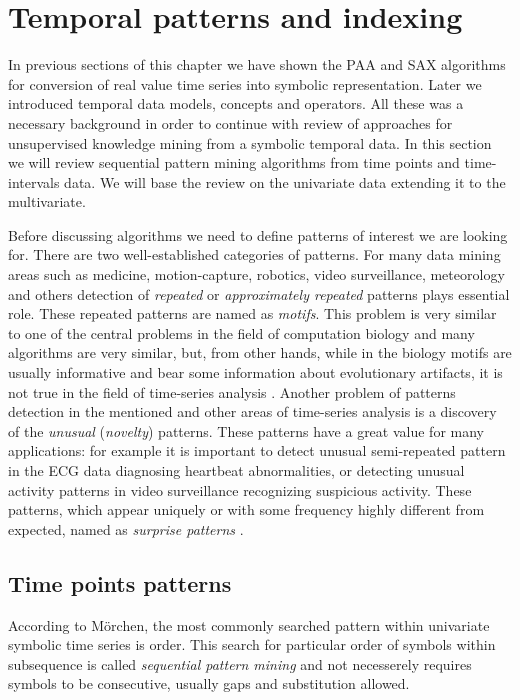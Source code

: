 \section{Temporal patterns and indexing} \label{tpatterns}
In previous sections of this chapter we have shown the PAA and SAX algorithms for conversion of real value time series into symbolic representation. Later we introduced temporal data models, concepts and operators. All these was a necessary background in order to continue with review of approaches for unsupervised knowledge mining from a symbolic temporal data. In this section we will review sequential pattern mining algorithms from time points and time-intervals data. We will base the review on the univariate data extending it to the multivariate.

Before discussing algorithms we need to define patterns of interest we are looking for. There are two well-established categories of patterns. For many data mining areas such as medicine, motion-capture, robotics, video surveillance, meteorology and others detection of \textit{repeated} or \textit{approximately repeated} patterns plays essential role. These repeated patterns are named as \textit{motifs}. This problem is very similar to one of the central problems in the field of computation biology \cite{citeulike:465665} and many algorithms are very similar, but, from other hands, while in the biology motifs are usually informative and bear some information about evolutionary artifacts, it is not true in the field of time-series analysis \cite{citeulike:3978085}. Another problem of patterns detection in the mentioned and other areas of time-series analysis is a discovery of the \textit{unusual} (\textit{novelty}) patterns. These patterns have a great value for many applications: for example it is important to detect unusual semi-repeated pattern in the ECG data diagnosing heartbeat abnormalities, or detecting unusual activity patterns in video surveillance recognizing suspicious activity. These patterns, which appear uniquely or with some frequency highly different from expected, named as \textit{surprise patterns} \cite{citeulike:3025877}.

\subsection{Time points patterns}
According to M\"orchen, the most commonly searched pattern within univariate symbolic time series is order. This search for particular order of symbols within subsequence is called \textit{sequential pattern mining} \cite{citeulike:775528} and not necesserely requires symbols to be consecutive, usually gaps and substitution allowed.

